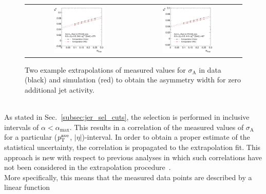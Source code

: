 \begin{figure}[!tp]
  \centering
  \begin{tabular}{cc}
                \includegraphics[width=0.49\textwidth]{figures/Extrapol_Eta0_pt4_final_nominal_v4.pdf} &
                \includegraphics[width=0.49\textwidth]{figures/Extrapol_Eta0_pt9_final_nominal_v4.pdf}
  \end{tabular}
  \caption{Two example extrapolations of measured values for $\sigma_\mathrm{A}$ in data (black) and simulation (red) to obtain the asymmetry width for zero additional jet activity.}
  \label{fig:extrapol}
\end{figure}
\\
As stated in Sec.~\ref{subsec:jer_sel_cuts}, the selection is performed in inclusive intervals of $\alpha < \alpha_\mathrm{max}$. This results in a correlation of the measured values of $\sigma_\mathrm{A}$ for a particular ($p_{\text{T}}^\mathrm{ave}$, $|\eta|$)-interval. In order to obtain a proper estimate of the statistical uncertainty, the correlation is propagated to the extrapolation fit. This approach is new with respect to previous analyses in which such correlations have not been considered in the extrapolation procedure~\cite{1748-0221-6-11-P11002, thesis:Schroeder, Aad:2012ag}. \\
More specifically, this means that the measured data points are described by a linear function 
